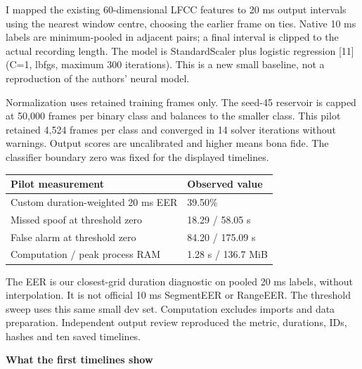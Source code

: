 \documentclass[10pt,a4paper]{article}
\newcommand{\reporttitle}[1]{{\color{navy}\Large\bfseries #1}\par\vspace{5pt}}
\begin{document}
I mapped the existing 60-dimensional LFCC features to 20 ms output intervals using the nearest window centre, choosing the earlier frame on ties. Native 10 ms labels are minimum-pooled in adjacent pairs; a final interval is clipped to the actual recording length. The model is StandardScaler plus logistic regression [11] (C=1, lbfgs, maximum 300 iterations). This is a new small baseline, not a reproduction of the authors' neural model.\par

Normalization uses retained training frames only. The seed-45 reservoir is capped at 50,000 frames per binary class and balances to the smaller class. This pilot retained 4,524 frames per class and converged in 14 solver iterations without warnings. Output scores are uncalibrated and higher means bona fide. The classifier boundary zero was fixed for the displayed timelines.\par

\begin{center}\small

\begin{tabular}{@{}ll@{}}\toprule

Pilot measurement & Observed value \\

\midrule

Custom duration-weighted 20 ms EER & 39.50\% \\

Missed spoof at threshold zero & 18.29 / 58.05 s \\

False alarm at threshold zero & 84.20 / 175.09 s \\

Computation / peak process RAM & 1.28 s / 136.7 MiB \\

\bottomrule\end{tabular}\end{center}

{\small The EER is our closest-grid duration diagnostic on pooled 20 ms labels, without interpolation. It is not official 10 ms SegmentEER or RangeEER. The threshold sweep uses this same small dev set. Computation excludes imports and data preparation. Independent output review reproduced the metric, durations, IDs, hashes and ten saved timelines.}\par

\clearpage

\reporttitle{What the first timelines show}
\end{document}
